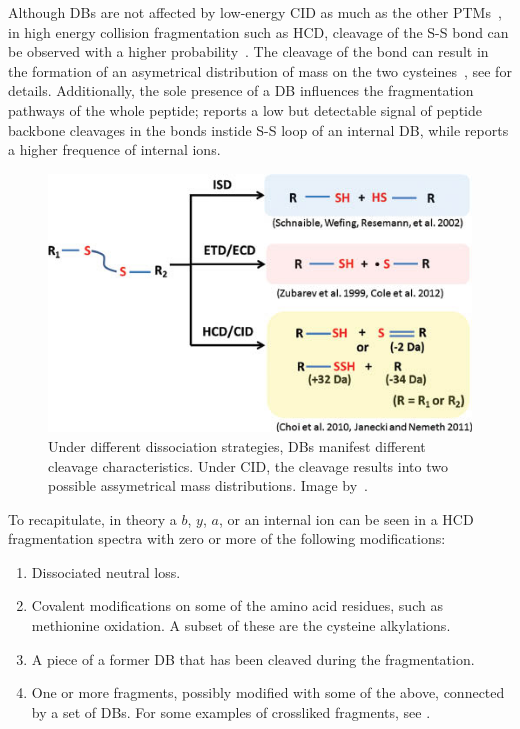 Although DBs are not affected by low-energy CID as much as the other PTMs~\cite{paizs2005fragmentation, lioe2007novel}, in high energy collision fragmentation such as HCD, cleavage of the S-S bond can be observed with a higher probability~\cite{bean1992characterization}. The cleavage of the bond can result in the formation of an asymetrical distribution of mass on the two cysteines~\cite{zhang2006mapping}, see  for details. Additionally, the sole presence of a DB influences the fragmentation pathways of the whole peptide; \citet{mormann2008fragmentation} reports a low but detectable signal of peptide backbone cleavages in the bonds instide S-S loop of an internal DB, while \citet{clark2011collision} reports a higher frequence of internal ions.

\begin{figure}
  \centering
  \includegraphics[width=.6\linewidth]{img/disulfide-bond-cleavage-assymetry.jpg}
  \caption{Under different dissociation strategies, DBs manifest different cleavage characteristics. Under CID, the cleavage results into two possible assymetrical mass distributions. Image by~\citet{tsai2013mass}.}\label{fig:disulfide-bond-cleavage-assymetry}
\end{figure}

To recapitulate, in theory a \(b\), \(y\), \(a\), or an internal ion can be seen in a HCD fragmentation spectra with zero or more of the following modifications:

\begin{enumerate}
  \item Dissociated neutral loss.
  \item Covalent modifications on some of the amino acid residues, such as methionine oxidation. A subset of these are the cysteine alkylations.
  \item A piece of a former DB that has been cleaved during the fragmentation.
  \item One or more fragments, possibly modified with some of the above, connected by a set of DBs. For some examples of crossliked fragments, see .
\end{enumerate}

